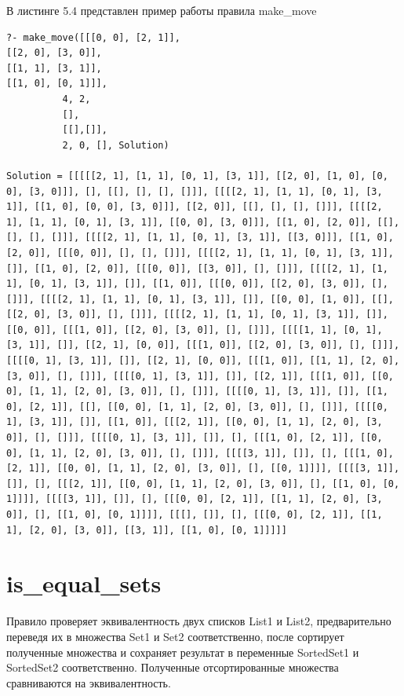 \documentclass[12pt]{report}
\begin{document}
В листинге 5.4 представлен пример работы правила make\_move
\begin{lstlisting}[caption=пример работы правила make\_move]
?- make_move([[[0, 0], [2, 1]],
[[2, 0], [3, 0]],
[[1, 1], [3, 1]],
[[1, 0], [0, 1]]],
          4, 2,
          [],
          [[],[]],
          2, 0, [], Solution)

Solution = [[[[[2, 1], [1, 1], [0, 1], [3, 1]], [[2, 0], [1, 0], [0, 0], [3, 0]]], [], [[], [], [], []]], [[[[2, 1], [1, 1], [0, 1], [3, 1]], [[1, 0], [0, 0], [3, 0]]], [[2, 0]], [[], [], [], []]], [[[[2, 1], [1, 1], [0, 1], [3, 1]], [[0, 0], [3, 0]]], [[1, 0], [2, 0]], [[], [], [], []]], [[[[2, 1], [1, 1], [0, 1], [3, 1]], [[3, 0]]], [[1, 0], [2, 0]], [[[0, 0]], [], [], []]], [[[[2, 1], [1, 1], [0, 1], [3, 1]], []], [[1, 0], [2, 0]], [[[0, 0]], [[3, 0]], [], []]], [[[[2, 1], [1, 1], [0, 1], [3, 1]], []], [[1, 0]], [[[0, 0]], [[2, 0], [3, 0]], [], []]], [[[[2, 1], [1, 1], [0, 1], [3, 1]], []], [[0, 0], [1, 0]], [[], [[2, 0], [3, 0]], [], []]], [[[[2, 1], [1, 1], [0, 1], [3, 1]], []], [[0, 0]], [[[1, 0]], [[2, 0], [3, 0]], [], []]], [[[[1, 1], [0, 1], [3, 1]], []], [[2, 1], [0, 0]], [[[1, 0]], [[2, 0], [3, 0]], [], []]], [[[[0, 1], [3, 1]], []], [[2, 1], [0, 0]], [[[1, 0]], [[1, 1], [2, 0], [3, 0]], [], []]], [[[[0, 1], [3, 1]], []], [[2, 1]], [[[1, 0]], [[0, 0], [1, 1], [2, 0], [3, 0]], [], []]], [[[[0, 1], [3, 1]], []], [[1, 0], [2, 1]], [[], [[0, 0], [1, 1], [2, 0], [3, 0]], [], []]], [[[[0, 1], [3, 1]], []], [[1, 0]], [[[2, 1]], [[0, 0], [1, 1], [2, 0], [3, 0]], [], []]], [[[[0, 1], [3, 1]], []], [], [[[1, 0], [2, 1]], [[0, 0], [1, 1], [2, 0], [3, 0]], [], []]], [[[[3, 1]], []], [], [[[1, 0], [2, 1]], [[0, 0], [1, 1], [2, 0], [3, 0]], [], [[0, 1]]]], [[[[3, 1]], []], [], [[[2, 1]], [[0, 0], [1, 1], [2, 0], [3, 0]], [], [[1, 0], [0, 1]]]], [[[[3, 1]], []], [], [[[0, 0], [2, 1]], [[1, 1], [2, 0], [3, 0]], [], [[1, 0], [0, 1]]]], [[[], []], [], [[[0, 0], [2, 1]], [[1, 1], [2, 0], [3, 0]], [[3, 1]], [[1, 0], [0, 1]]]]]
\end{lstlisting}
\section{is\_equal\_sets}
Правило проверяет эквивалентность двух списков List1 и List2, предварительно переведя их в множества Set1 и Set2 соответственно, после сортирует полученные множества и сохраняет результат в переменные SortedSet1 и SortedSet2 соответственно. Полученные отсортированные множества сравниваются на эквивалентность.
\end{document}
